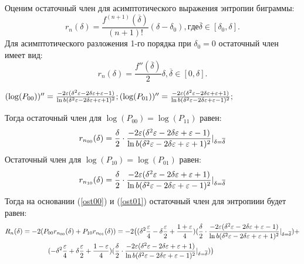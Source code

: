 \documentclass[a4paper,12pt]{article}
\theoremstyle{plain}
\begin{document}
Оценим остаточный член для асимптотического выражения энтропии биграммы:
\begin{equation}
	r_n(\delta)=\frac{f^{(n+1)}(\overline{\delta})}{(n+1)!}(\delta-\delta_0), где \overline{\delta} \in [\delta_0, \delta].
\end{equation}
Для асимптотического разложения 1-го порядка при $\delta_0=0$ остаточный член имеет вид:\\
\begin{equation}
	r_n(\delta)=\frac{f''(\overline{\delta})}{2}\delta,\overline{\delta} \in [0, \delta].
\end{equation}
\begin{center}
	$(\log(P_{00}))''=\frac{-2\varepsilon(\delta^2\varepsilon-2\delta\varepsilon+\varepsilon-1)}{\ln b (\delta^2\varepsilon-2\delta\varepsilon+\varepsilon+1)^2};\newline
(\log(P_{01}))''=\frac{-2\varepsilon(\delta^2\varepsilon-2\delta\varepsilon+\varepsilon+1)}{\ln b (\delta^2\varepsilon-2\delta\varepsilon+\varepsilon-1)^2};\newline$

\end{center}
Тогда остаточный член для $\log(P_{00})=\log(P_{11})$ равен:\\
\begin{equation}\label{ost00}
r_{n_{00}}(\delta)=\frac{\delta}{2}\cdot \frac{-2\varepsilon(\delta^2\varepsilon-2\delta\varepsilon+\varepsilon-1)}{\ln b (\delta^2\varepsilon-2\delta\varepsilon+\varepsilon+1)^2}|_{\delta=\overline{\delta}}\newline
\end{equation}
Остаточный член для $\log(P_{10})=\log(P_{01})$ равен:\\
\begin{equation}\label{ost01}
r_{n_{10}}(\delta)=\frac{\delta}{2}\cdot \frac{-2\varepsilon(\delta^2\varepsilon-2\delta\varepsilon+\varepsilon+1)}{\ln b (\delta^2\varepsilon-2\delta\varepsilon+\varepsilon-1)^2}|_{\delta=\overline{\delta}}\newline
\end{equation}
Тогда на основании (\ref{ost00}) и (\ref{ost01}) остаточный член для энтропиии будет равен:\\
\begin{gather*}
R_n(\delta)=-2(P_{00}r_{n_{00}}(\delta)+P_{10}r_{n_{01}}(\delta))=-2\bigr((\delta^2\frac{\varepsilon}{4}-\delta\frac{\varepsilon}{2}+\frac{1+\varepsilon}{4})(\frac{\delta}{2}\cdot \frac{-2\varepsilon(\delta^2\varepsilon-2\delta\varepsilon+\varepsilon-1)}{\ln b (\delta^2\varepsilon-2\delta\varepsilon+\varepsilon+1)^2}|_{\delta=\overline{\delta}}) +\\ (-\delta^2\frac{\varepsilon}{4}+\delta\frac{\varepsilon}{2}+\frac{1-\varepsilon}{4})(\frac{\delta}{2}\cdot \frac{-2\varepsilon(\delta^2\varepsilon-2\delta\varepsilon+\varepsilon+1)}{\ln b (\delta^2\varepsilon-2\delta\varepsilon+\varepsilon-1)^2}|_{\delta=\overline{\delta}})\bigr) \newline
\end{gather*}
\end{document}
